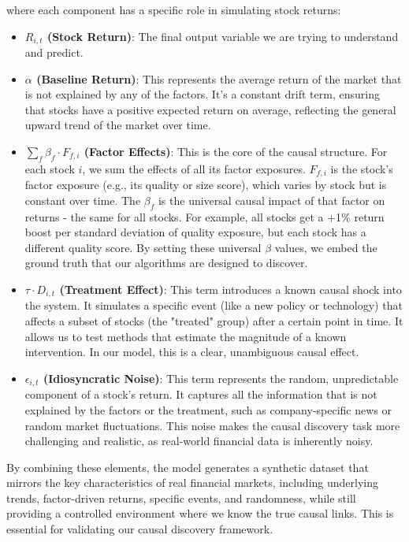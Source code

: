 where each component has a specific role in simulating stock returns:
\begin{itemize}
    \itemsep0em 
    \item \textbf{$R_{i,t}$ (Stock Return)}: The final output variable we are trying to understand and predict.
    \item \textbf{$\alpha$ (Baseline Return)}: This represents the average return of the market that is not explained by any of the factors. It's a constant drift term, ensuring that stocks have a positive expected return on average, reflecting the general upward trend of the market over time.
    \item \textbf{$\sum_{f} \beta_f \cdot F_{f,i}$ (Factor Effects)}: This is the core of the causal structure. For each stock $i$, we sum the effects of all its factor exposures. $F_{f,i}$ is the stock's factor exposure (e.g., its quality or size score), which varies by stock but is constant over time. The $\beta_f$ is the universal causal impact of that factor on returns - the same for all stocks. For example, all stocks get a +1\% return boost per standard deviation of quality exposure, but each stock has a different quality score. By setting these universal $\beta$ values, we embed the ground truth that our algorithms are designed to discover.
    \item \textbf{$\tau \cdot D_{i,t}$ (Treatment Effect)}: This term introduces a known causal shock into the system. It simulates a specific event (like a new policy or technology) that affects a subset of stocks (the "treated" group) after a certain point in time. It allows us to test methods that estimate the magnitude of a known intervention. In our model, this is a clear, unambiguous causal effect.
    \item \textbf{$\epsilon_{i,t}$ (Idiosyncratic Noise)}: This term represents the random, unpredictable component of a stock's return. It captures all the information that is not explained by the factors or the treatment, such as company-specific news or random market fluctuations. This noise makes the causal discovery task more challenging and realistic, as real-world financial data is inherently noisy.
\end{itemize}

By combining these elements, the model generates a synthetic dataset that mirrors the key characteristics of real financial markets, including underlying trends, factor-driven returns, specific events, and randomness, while still providing a controlled environment where we know the true causal links. This is essential for validating our causal discovery framework.

